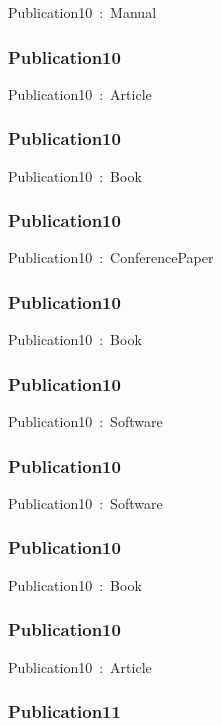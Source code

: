 \documentclass{article}
\begin{document}
Publication10~:~Manual

\subsubsection*{Publication10}

Publication10~:~Article

\subsubsection*{Publication10}

Publication10~:~Book

\subsubsection*{Publication10}

Publication10~:~ConferencePaper

\subsubsection*{Publication10}

Publication10~:~Book

\subsubsection*{Publication10}

Publication10~:~Software

\subsubsection*{Publication10}

Publication10~:~Software

\subsubsection*{Publication10}

Publication10~:~Book

\subsubsection*{Publication10}

Publication10~:~Article

\subsubsection*{Publication11}
\end{document}
